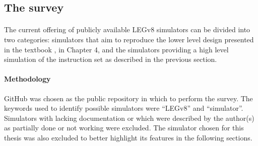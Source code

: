 \subsection{The survey}

\paragraph{}
The current offering of publicly available LEGv8 simulators can be divided into two categories: simulators that aim to reproduce the lower level design presented in the textbook \cite{patterson2016computer}, in Chapter 4, and the simulators providing a high level simulation of the instruction set as described in the previous section.
\paragraph{Methodology}
GitHub \cite{githubweb} was chosen as the public repository in which to perform the survey. The keywords used to identify possible simulators were ``LEGv8'' and ``simulator''. Simulators with lacking documentation or which were described by the author(s) as partially done or not working were excluded. The simulator chosen for this thesis was also excluded to better highlight its features in the following sections.

